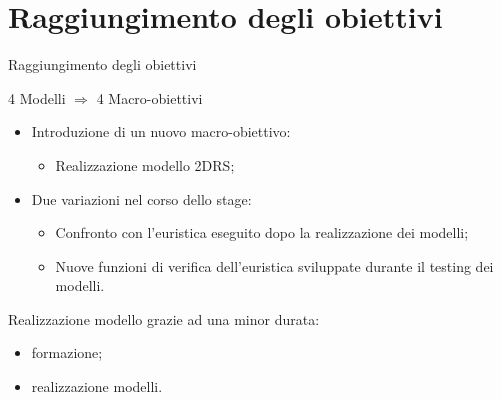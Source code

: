 \documentclass{beamer}
\begin{document}
\section{Raggiungimento degli obiettivi}
\begin{frame}{Raggiungimento degli obiettivi}
	\begin{center}
		4 Modelli $\Rightarrow$ 4 Macro-obiettivi
	\end{center}
		
	\begin{itemize}
		\item Introduzione di un nuovo macro-obiettivo:
		      \begin{itemize}
		      	\item Realizzazione modello 2DRS;
		      \end{itemize}
		\item Due variazioni nel corso dello stage:
		      \begin{itemize}
		      	\item Confronto con l'euristica eseguito dopo la realizzazione dei modelli;
		      	\item Nuove funzioni di verifica dell'euristica sviluppate durante il testing dei modelli.
		      \end{itemize}
	\end{itemize}
	Realizzazione modello grazie ad una minor durata:
	\begin{itemize}
		\item formazione;
		\item realizzazione modelli.
	\end{itemize}
\end{frame}
\end{document}
